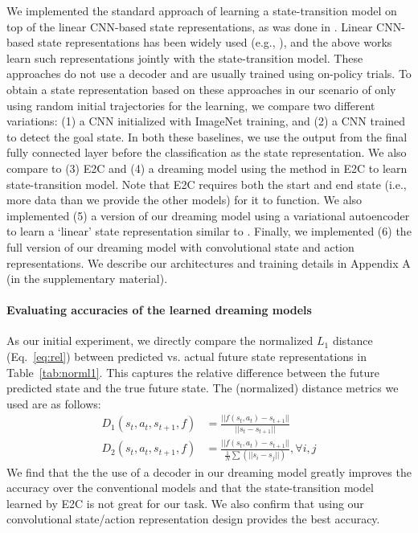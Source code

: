 \documentclass[letterpaper, 10 pt, conference]{ieeeconf}
\begin{document}
We implemented the standard approach of learning a state-transition model on top of the linear CNN-based state representations, as was done in \cite{heess2015learning,oh2017value,weber2017imagination}. Linear CNN-based state representations has been widely used (e.g., \cite{mnih2013playing}), and the above works learn such representations jointly with the state-transition model.
These approaches do not use a decoder and are usually trained using on-policy trials. To obtain a state representation based on these approaches in our scenario of only using random initial trajectories for the learning, we compare two different variations: (1)
a CNN initialized with ImageNet \cite{deng2009imagenet} training, and (2) a CNN trained to detect the goal state. In both these baselines, we use the output from the final fully connected layer before the classification as the state representation. We also compare to (3) E2C \cite{watter2015embed} and (4) a dreaming model using the method in E2C to learn state-transition model. Note that E2C requires both the start and end state (i.e., more data than we provide the other models) for it to function.
We also implemented (5) a version of our dreaming model using a variational autoencoder to learn a `linear' state representation similar to \cite{ha2018world}.
Finally, we implemented (6) the full version of our dreaming model with convolutional state and action representations. We describe our architectures and training details in Appendix A (in the supplementary material).



\paragraph{Evaluating accuracies of the learned dreaming models}
As our initial experiment, we directly compare the normalized $L_1$ distance (Eq.~\ref{eq:rel}) between predicted vs. actual future state representations in Table~\ref{tab:norml1}. This captures the relative difference between the future predicted state and the true future state.
The (normalized) distance metrics we used are as follows:
\begin{equation}
\begin{split}
    \label{eq:rel}
    D_1(s_t,a_t, s_{t+1}, f) &= \frac{||f(s_t, a_t) - s_{t+1}||}{||s_t - s_{t+1}||}\\
    D_2(s_t,a_t, s_{t+1}, f) &= \frac{||f(s_t, a_t) - s_{t+1}||}{\frac{1}{N}\sum(||s_i - s_j||)}, \forall i,j
    \end{split}
\end{equation}
We find that the the use of a decoder in our dreaming model greatly improves the accuracy over the conventional models and that the state-transition model learned by E2C is not great for our task. We also confirm that using our convolutional state/action representation design provides the best accuracy.
\end{document}
